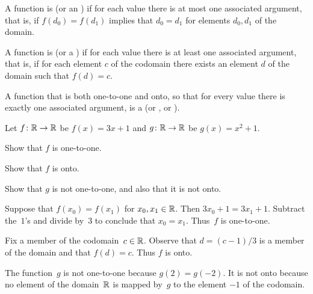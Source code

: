 \documentclass{ibl}
\begin{document}
\begin{df}
A function is  (or an ) 
if for each value there is at most
one associated argument, that is, if $f(d_0)=f(d_1)$ implies that $d_0=d_1$
for elements $d_0,d_1$ of the domain.

A function is  (or a ) 
if for each value there is at least
one associated argument, that is, if for each element $c$ of the codomain
there exists an element $d$ of the domain such that $f(d)=c$.

A function that is both one-to-one and onto, so that for every value there
is exactly one associated argument, is a 
 (or , or ).
\end{df}

\begin{ex} Let $\mbox{$f\colon \mathbb{R}\to \mathbb{R}$}$ be $f(x)=3x+1$ and 
  $\mbox{$g\colon \mathbb{R}\to \mathbb{R}$}$ be $g(x)=x^2+1$.
\begin{exes}
\item Show that $f$ is one-to-one.
\item Show that $f$ is onto.    
\item Show that $g$ is not one-to-one, and also that it is not onto.
\end{exes}
\begin{ans}
\begin{exes}
\item Suppose that $f(x_0)=f(x_1)$ for $x_0,x_1\in\mathbb{R}$.
  Then $3x_0+1=3x_1+1$.
  Subtract the~$1$'s and divide by~$3$ to conclude that $x_0=x_1$.
  Thus~$f$ is one-to-one. 
\item Fix a member of the codomain~$c\in\mathbb{R}$.
  Observe that $d=(c-1)/3$ is a member of the domain and that 
  $f(d)=c$.
  Thus $f$ is onto.
\item The function~$g$ is not one-to-one because $g(2)=g(-2)$.
  It is not onto because no element of the domain~$\mathbb{R}$ is mapped by~$g$
  to the element $-1$ of the codomain.        
\end{exes}
\end{ans}
\end{ex}
\end{document}
